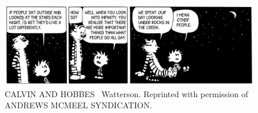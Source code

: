 

\begin{figure}
\begin{center}
\centerline{\includegraphics[width=1\linewidth]{figures/calvin_and_hobbes.png}}
  \caption*{\tiny CALVIN AND HOBBES \textcopyright\  Watterson. Reprinted with permission of ANDREWS MCMEEL SYNDICATION.}
\end{center}
\end{figure}


